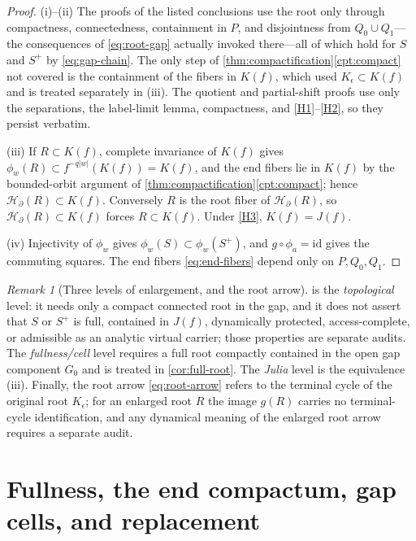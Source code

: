 \documentclass[11pt,reqno]{amsart}
\numberwithin{equation}{section}
\theoremstyle{plain}
\theoremstyle{definition}
\theoremstyle{remark}
\newtheorem{remark}[theorem]{Remark}
\newcommand{\HB}{\mathcal H_\partial}
\newcommand{\rootK}{K_{\epsilon}}
\begin{document}
\begin{proof}
(i)--(ii)  The proofs of the listed conclusions use the root only
through compactness, connectedness, containment in $P$, and
disjointness from $Q_0\cup Q_1$---the consequences of
\eqref{eq:root-gap} actually invoked there---all of which hold for $S$
and $S^+$ by \eqref{eq:gap-chain}.  The only step of
\cref{thm:compactification}\ref{cpt:compact} not covered is the
containment of the fibers in $K(f)$, which used
$\rootK\subset K(f)$ and is treated separately in (iii).  The quotient
and partial-shift proofs use only the separations, the label-limit
lemma, compactness, and \ref{H1}--\ref{H2}, so they persist verbatim.

(iii)  If $R\subset K(f)$, complete invariance of $K(f)$ gives
$\phi_w(R)\subset f^{-q|w|}(K(f))=K(f)$, and the end fibers lie in
$K(f)$ by the bounded-orbit argument of
\cref{thm:compactification}\ref{cpt:compact}; hence
$\HB(R)\subset K(f)$.  Conversely $R$ is the root fiber of $\HB(R)$,
so $\HB(R)\subset K(f)$ forces $R\subset K(f)$.  Under \ref{H3},
$K(f)=J(f)$.

(iv)  Injectivity of $\phi_w$ gives
$\phi_w(S)\subset\phi_w(S^+)$, and $g\circ\phi_a=\mathrm{id}$ gives the
commuting squares.  The end fibers \eqref{eq:end-fibers} depend only on
$P,Q_0,Q_1$.
\end{proof}

\begin{remark}[Three levels of enlargement, and the root arrow]
\label{rem:enlargement-scope}
 is the \emph{topological} level: it needs
only a compact connected root in the gap, and it does not assert that
$S$ or $S^+$ is full, contained in $J(f)$, dynamically protected,
access-complete, or admissible as an analytic virtual carrier; those
properties are separate audits.  The \emph{fullness/cell} level
requires a full root compactly contained in the open gap component
$G_0$ and is treated in \cref{cor:full-root}.  The \emph{Julia} level
is the equivalence (iii).  Finally, the root arrow
\eqref{eq:root-arrow} refers to the terminal cycle of the original
root $\rootK$; for an enlarged root $R$ the image $g(R)$ carries no
terminal-cycle identification, and any dynamical meaning of the
enlarged root arrow requires a separate audit.
\end{remark}

\section{Fullness, the end compactum, gap cells, and replacement}
\label{sec:fullness}
\end{document}
